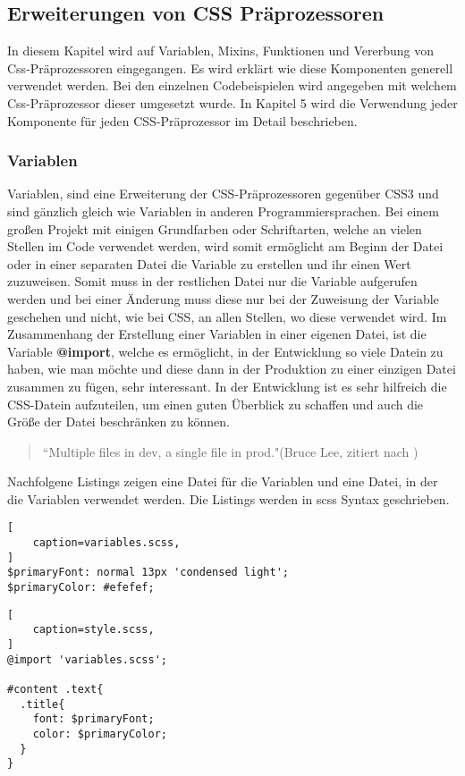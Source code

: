\subsection{Erweiterungen von CSS Präprozessoren}
In diesem Kapitel wird auf Variablen, Mixins, Funktionen und Vererbung von Css-Präprozessoren eingegangen. Es wird erklärt wie diese Komponenten generell verwendet werden. Bei den einzelnen Codebeispielen wird angegeben mit welchem Css-Präprozessor dieser umgesetzt wurde. In Kapitel 5 wird die Verwendung jeder Komponente für jeden CSS-Präprozessor im Detail beschrieben.
\subsubsection{Variablen}
Variablen, sind eine Erweiterung der CSS-Präprozessoren gegenüber CSS3 und sind gänzlich gleich wie Variablen in anderen Programmiersprachen.
Bei einem großen Projekt mit einigen Grundfarben oder Schriftarten, welche an vielen Stellen im Code verwendet werden, wird somit ermöglicht am Beginn der Datei oder in einer separaten Datei die Variable zu erstellen und ihr einen Wert zuzuweisen. Somit muss in der restlichen Datei nur die Variable aufgerufen werden und bei einer Änderung muss diese nur bei der Zuweisung der Variable geschehen und nicht, wie bei CSS, an allen Stellen, wo diese verwendet wird.\autocite[]{Yard.2014} \newline
Im Zusammenhang der Erstellung einer Variablen in einer eigenen Datei, ist die Variable \textbf{@import}, welche es ermöglicht, in der Entwicklung so viele Datein zu haben, wie man möchte und diese dann in der Produktion zu einer einzigen Datei zusammen zu fügen, sehr interessant\autocite[]{Giraudel.2014}.\newline
In der Entwicklung ist es sehr hilfreich die CSS-Datein aufzuteilen, um einen guten Überblick zu schaffen und auch die Größe der Datei beschränken zu können.
\begin{quote}
``Multiple files in dev, a single file in prod."(Bruce Lee, zitiert nach \cite[]{Giraudel.2014})
\end{quote}

Nachfolgene Listings zeigen eine Datei für die Variablen und eine Datei, in der die Variablen verwendet werden. Die Listings werden in scss Syntax geschrieben.
\begin{lstlisting}[
	caption=variables.scss,
]
$primaryFont: normal 13px 'condensed light';
$primaryColor: #efefef;
\end{lstlisting}
\begin{lstlisting}[
	caption=style.scss,
]
@import 'variables.scss';

#content .text{
  .title{
    font: $primaryFont;
    color: $primaryColor;
  }
}
\end{lstlisting}

